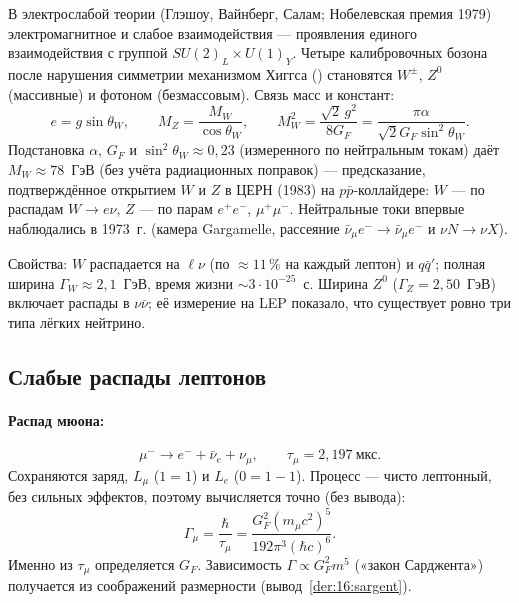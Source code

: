 В электрослабой теории (Глэшоу, Вайнберг, Салам; Нобелевская премия 1979) электромагнитное и слабое
взаимодействия — проявления единого взаимодействия с группой $SU(2)_L\times U(1)_Y$. Четыре калибровочных бозона
после нарушения симметрии механизмом Хиггса () становятся $W^\pm$, $Z^0$ (массивные) и фотоном (безмассовым).
Связь масс и констант:
\begin{equation}\label{eq:16:ew}
  e=g\sin\theta_W,\qquad M_Z=\frac{M_W}{\cos\theta_W},\qquad
  M_W^2=\frac{\sqrt2\,g^2}{8G_F}=\frac{\pi\alpha}{\sqrt2G_F\sin^2\theta_W}.
\end{equation}
Подстановка $\alpha$, $G_F$ и $\sin^2\theta_W\approx0{,}23$ (измеренного по нейтральным токам) даёт $M_W\approx78$~ГэВ (без учёта радиационных
поправок) — предсказание, подтверждённое открытием $W$ и $Z$ в ЦЕРН (1983) на $p\bar p$-коллайдере: $W$ — по
распадам $W\to e\nu$, $Z$ — по парам $e^+e^-$, $\mu^+\mu^-$. Нейтральные токи впервые наблюдались в 1973~г. (камера Gargamelle,
рассеяние $\bar\nu_\mu e^-\to\bar\nu_\mu e^-$ и $\nu N\to\nu X$).

Свойства: $W$ распадается на $\ell\nu$ (по $\approx11\,\%$ на каждый лептон) и $q\bar q'$; полная ширина $\Gamma_W\approx2{,}1$~ГэВ,
время жизни $\sim3\cdot10^{-25}$~с. Ширина $Z^0$ ($\Gamma_Z=2{,}50$~ГэВ) включает распады в $\nu\bar\nu$; её измерение на LEP показало,
что существует ровно три типа лёгких нейтрино.

\subsection{Слабые распады лептонов}

\paragraph{Распад мюона:}
\begin{equation}\label{eq:16:mu}
  \mu^-\to e^-+\bar\nu_e+\nu_\mu,\qquad \tau_\mu=2{,}197\ \text{мкс}.
\end{equation}
Сохраняются заряд, $L_\mu$ ($1=1$) и $L_e$ ($0=1-1$). Процесс — чисто лептонный, без сильных эффектов, поэтому вычисляется
точно (без вывода):
\begin{equation}\label{eq:16:Gmu}
  \Gamma_\mu=\frac{\hbar}{\tau_\mu}=\frac{G_F^2(m_\mu c^2)^5}{192\pi^3(\hbar c)^6}.
\end{equation}
Именно из $\tau_\mu$ определяется $G_F$. Зависимость $\Gamma\propto G_F^2m^5$ («закон Сарджента») получается из соображений
размерности (вывод~\ref{der:16:sargent}).

